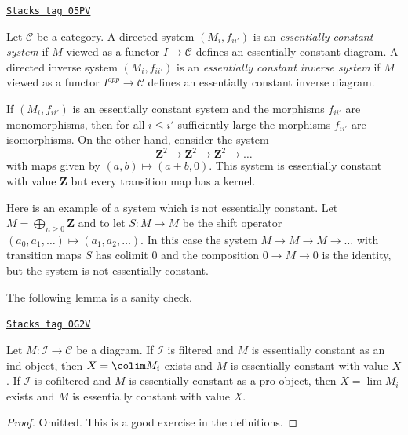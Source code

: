 \begin{definition}
\label{categories-definition-essentially-constant-system}
\href{https://stacks.math.columbia.edu/tag/05PV}{\texttt{Stacks tag 05PV}}

Let $\mathcal{C}$ be a category. A directed system
$(M_i, f_{ii'})$ is an {\it essentially constant system}
if $M$ viewed as a functor $I \to \mathcal{C}$
defines an essentially constant diagram. A directed inverse system
$(M_i, f_{ii'})$ is an {\it essentially constant inverse system} if
$M$ viewed as a functor $I^{opp} \to \mathcal{C}$ defines an
essentially constant inverse diagram.
\end{definition}

If $(M_i, f_{ii'})$ is an essentially constant system and the morphisms
$f_{ii'}$ are monomorphisms, then for all $i \leq i'$ sufficiently large the
morphisms $f_{ii'}$ are isomorphisms. On the other hand, consider the system
$$
\mathbf{Z}^2 \to \mathbf{Z}^2 \to \mathbf{Z}^2 \to \ldots
$$
with maps given by $(a, b) \mapsto (a + b, 0)$. This system is essentially
constant with value $\mathbf{Z}$ but every transition map has a kernel.

\medskip\noindent
Here is an example of a system which is not essentially constant. Let
$M = \bigoplus_{n \geq 0} \mathbf{Z}$ and to let $S : M \to M$ be the
shift operator $(a_0, a_1, \ldots) \mapsto (a_1, a_2, \ldots)$. In this
case the system $M \to M \to M \to \ldots$ with transition maps $S$
has colimit $0$ and the composition $0 \to M \to 0$ is the identity,
but the system is not essentially constant.

\medskip\noindent
The following lemma is a sanity check.

\begin{lemma}
\label{categories-lemma-essentially-constant-is-limit-colimit}
\href{https://stacks.math.columbia.edu/tag/0G2V}{\texttt{Stacks tag 0G2V}}

Let $M : \mathcal{I} \to \mathcal{C}$ be a diagram.
If $\mathcal{I}$ is filtered and $M$ is essentially
constant as an ind-object, then $X = \colim M_i$ exists and $M$
is essentially constant with value $X$.
If $\mathcal{I}$ is cofiltered and $M$ is essentially
constant as a pro-object, then $X = \lim M_i$ exists and $M$ is
essentially constant with value $X$.
\end{lemma}

\begin{proof}
Omitted. This is a good exercise in the definitions.
\end{proof}

